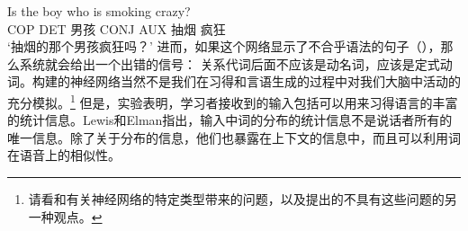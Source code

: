 \ea
\gll Is the boy who is smoking crazy?\\
COP DET 男孩 CONJ AUX 抽烟 疯狂\\
\glt `抽烟的那个男孩疯狂吗？'
\z
进而，如果这个网络显示了不合乎语法的句子（），那么系统就会给出一个出错的信号：
\z
关系代词后面不应该是动名词，应该是定式动词。构建的神经网络当然不是我们在习得和言语生成的过程中对我们大脑中活动的充分模拟。\footnote{
请看\citet[]{Hurford2002a}和\citet[Section~6.2]{Jackendoff2007a}有关神经网络的特定类型带来的问题，以及\citet{Pulvermueller2003a,Pulvermueller2010a}提出的不具有这些问题的另一种观点。
} 但是，实验表明，学习者接收到的输入包括可以用来习得语言的丰富的统计信息。Lewis和Elman指出，输入中词的分布的统计信息不是说话者所有的唯一信息。除了关于分布的信息，他们也暴露在上下文的信息中，而且可以利用词在语音上的相似性。
